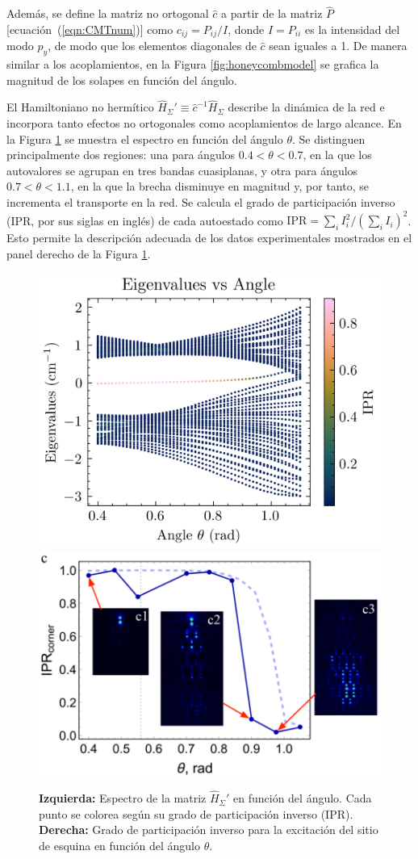 Además, se define la matriz no ortogonal $\hat{c}$ a partir de la matriz $\hat{P}$ [ecuación~(\ref{eqn:CMTnum})] como $c_{ij} = P_{ij}/I$, donde $I = P_{ii}$ es la intensidad del modo $p_y$, de modo que los elementos diagonales de $\hat{c}$ sean iguales a 1. De manera similar a los acoplamientos, en la Figura \ref{fig:honeycombmodel} se grafica la magnitud de los solapes en función del ángulo.

El Hamiltoniano no hermítico $\hat{H}_\Sigma' \equiv \hat{c}^{-1} \hat{H}_\Sigma$ describe la dinámica de la red e incorpora tanto efectos no ortogonales como acoplamientos de largo alcance. En la Figura \ref{fig:honeycomb-spectra} se muestra el espectro en función del ángulo $\theta$. Se distinguen principalmente dos regiones: una para ángulos $0.4 < \theta < 0.7$, en la que los autovalores se agrupan en tres bandas cuasiplanas, y otra para ángulos $0.7 < \theta < 1.1$, en la que la brecha disminuye en magnitud y, por tanto, se incrementa el transporte en la red. Se calcula el grado de participación inverso (IPR, por sus siglas en inglés) de cada autoestado como $\text{IPR} = \sum_i I_i^2/(\sum_i I_i)^2$. Esto permite la descripción adecuada de los datos experimentales mostrados en el panel derecho de la Figura \ref{fig:honeycomb-spectra}.

\begin{figure}[H]
	\centering
	\includegraphics[width=0.45\linewidth]{codigo/honeycomb_eigenvalues_vs_angle.png}
	\includegraphics[width=0.5\linewidth]{media/ipr-corner-exp.png}
	\caption[Espectro de la red de panal de abeja de modos $p_y$ en función del ángulo]{\textbf{Izquierda:} Espectro de la matriz $\hat{H}_\Sigma'$ en función del ángulo. Cada punto se colorea según su grado de participación inverso (IPR). \textbf{Derecha:} Grado de participación inverso para la excitación del sitio de esquina en función del ángulo $\theta$.\label{fig:honeycomb-spectra}}
\end{figure}


